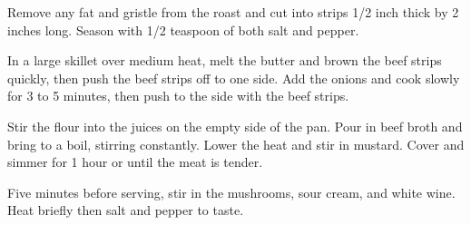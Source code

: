 
\info[servings=8,
		time = 1:40,
		timeunit = h:min,
		energy = 304, 
		urlsource = http://allrecipes.com/recipe/25202/beef-stroganoff-iii/]{}

\begin{ingredients}
\end{ingredients}

\begin{preparation}
	\step Remove any fat and gristle from the roast and cut into strips 1/2 inch thick by 2 inches long. Season with 1/2 teaspoon of both salt and pepper.
	
	\step In a large skillet over medium heat, melt the butter and brown the beef strips quickly, then push the beef strips off to one side. Add the onions and cook slowly for 3 to 5 minutes, then push to the side with the beef strips.
	
	\step Stir the flour into the juices on the empty side of the pan. Pour in beef broth and bring to a boil, stirring constantly. Lower the heat and stir in mustard. Cover and simmer for 1 hour or until the meat is tender.
	
	\step Five minutes before serving, stir in the mushrooms, sour cream, and white wine. Heat briefly then salt and pepper to taste.
\end{preparation}


\begin{notes}
\end{notes}


